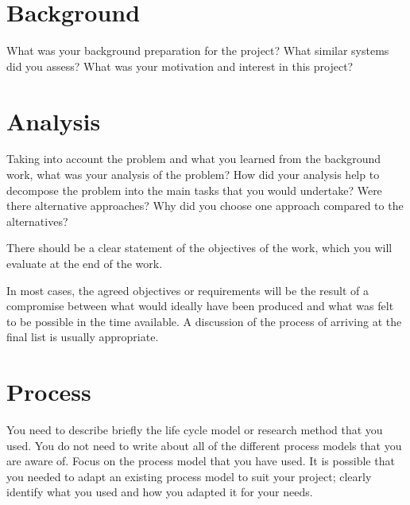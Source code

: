 \section{Background}
What was your background preparation for the project? What similar systems did you assess? What was your motivation and interest in this project? 

   

\section{Analysis}
Taking into account the problem and what you learned from the background work, what was your analysis of the problem? How did your analysis help to decompose the problem into the main tasks that you would undertake? Were there alternative approaches? Why did you choose one approach compared to the alternatives? 

There should be a clear statement of the objectives of the work, which you will evaluate at the end of the work. 

In most cases, the agreed objectives or requirements will be the result of a compromise between what would ideally have been produced and what was felt to be possible in the time available. A discussion of the process of arriving at the final list is usually appropriate.

\section{Process}
You need to describe briefly the life cycle model or research method that you used. You do not need to write about all of the different process models that you are aware of. Focus on the process model that you have used. It is possible that you needed to adapt an existing process model to suit your project; clearly identify what you used and how you adapted it for your needs.

